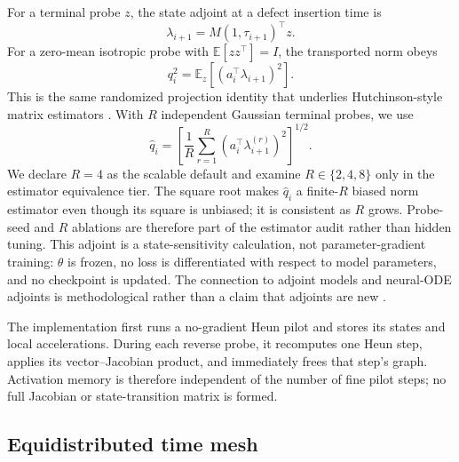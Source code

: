 For a terminal probe $z$, the state adjoint at a defect insertion time is
\begin{equation}
  \lambda_{i+1}=M(1,\tau_{i+1})^\top z.
  \label{eq:discrete-adjoint}
\end{equation}
For a zero-mean isotropic probe with $\mathbb{E}[zz^\top]=I$, the transported norm obeys
\begin{equation}
  q_i^2
  =
  \mathbb{E}_z\left[
    \left(a_i^\top\lambda_{i+1}\right)^2
  \right].
  \label{eq:randomized-norm-identity}
\end{equation}
This is the same randomized projection identity that underlies Hutchinson-style matrix estimators
\citep{hutchinson1989stochastic}. With $R$ independent Gaussian terminal probes, we use
\begin{equation}
  \widehat q_i
  =
  \left[
    \frac{1}{R}\sum_{r=1}^{R}
    \left(a_i^\top\lambda_{i+1}^{(r)}\right)^2
  \right]^{1/2}.
  \label{eq:randomized-adjoint-estimator}
\end{equation}
We declare $R=4$ as the scalable default and examine $R\in\{2,4,8\}$ only in the estimator
equivalence tier. The square root makes $\widehat q_i$ a finite-$R$ biased norm estimator even
though its square is unbiased; it is consistent as $R$ grows. Probe-seed and $R$ ablations are
therefore part of the estimator audit rather than hidden tuning. This adjoint is a
state-sensitivity calculation, not parameter-gradient
training: $\theta$ is frozen, no loss is differentiated with respect to model parameters, and no
checkpoint is updated. The connection to adjoint models and neural-ODE adjoints is methodological
rather than a claim that adjoints are new \citep{errico1997adjoint,chen2018neuralode}.

The implementation first runs a no-gradient Heun pilot and stores its states and local
accelerations. During each reverse probe, it recomputes one Heun step, applies its vector--Jacobian
product, and immediately frees that step's graph. Activation memory is therefore independent of
the number of fine pilot steps; no full Jacobian or state-transition matrix is formed.

\subsection{Equidistributed time mesh}
\label{sec:mesh-rule}


